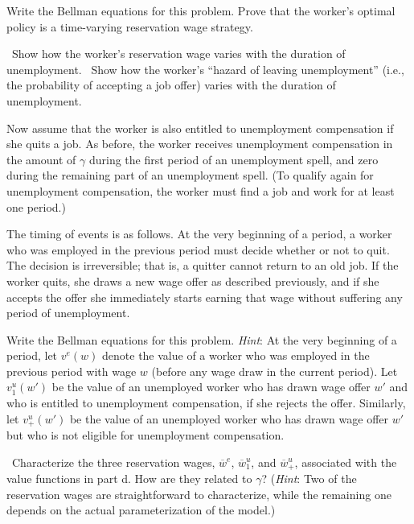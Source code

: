 \medskip
{}  Write the Bellman equations for this problem.
Prove that the worker's optimal policy is a time-varying reservation
wage strategy.

\medskip
{} \ Show how the worker's   reservation wage varies
with the duration of unemployment.
\medskip
{}  \ Show how the worker's ``hazard of leaving
unemployment'' (i.e., the probability of accepting a job offer)
varies with the duration of unemployment.

\medskip

Now assume that the worker is also entitled to unemployment compensation
if she quits a job. As before, the worker receives unemployment
compensation in the amount of $\gamma$ during the first period of
an unemployment spell, and zero during the remaining part of an
unemployment spell. (To qualify again for unemployment compensation, the
worker must find a job and work for at least one period.)



The timing of events is as follows. At the very beginning of a period,
a worker who was employed in the previous period must decide whether
or not to quit. The decision is irreversible; that is, a quitter cannot
return to an old job. If the worker quits, she draws a new wage offer
as described previously, and if she accepts the offer she immediately
starts earning that wage without suffering any period of unemployment.


\medskip
{} Write the Bellman equations for this problem.
{\it Hint}: At the very beginning of a period, let $v^e(w)$ denote the
value of a worker who was employed in the previous period with
wage $w$ (before any wage draw in the current period). Let $v^u_1(w')$
be the value of an unemployed worker who has drawn wage offer $w'$ and
who is entitled to unemployment compensation, if she rejects the
offer. Similarly, let $v^u_+(w')$ be the value of an unemployed
worker who has drawn wage offer $w'$ but who is not eligible for
unemployment compensation.


\medskip
{} \ Characterize the three reservation wages,
$\overline w^e$, $\overline w^u_1$, and $\overline w^u_+$, associated
with the value functions in part d. How are they related to $\gamma$?
({\it Hint}: Two of the reservation wages are straightforward to
characterize, while the
remaining one depends on the actual parameterization of the model.)


